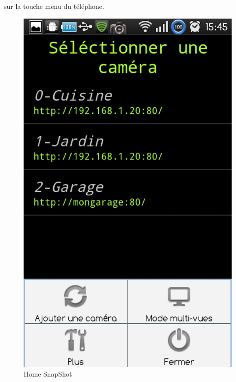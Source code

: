  sur la touche menu du téléphone.\newline
 \begin{center}
 \begin{figure}[H] 
  \label{homeScreenShot}
  \centering
  \includegraphics[scale=0.3]{Images/homeScreenShot.eps}
  \caption{Home SnapShot}
\end{figure}  
\end{center}

